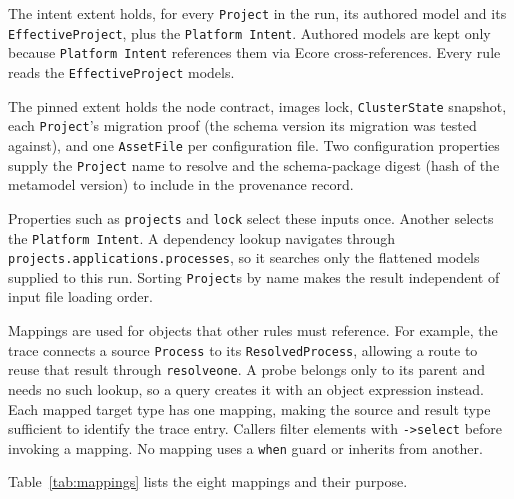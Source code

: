 The intent extent holds, for every \texttt{Project} in the run, its authored model and
its \texttt{EffectiveProject}, plus the \texttt{Platform Intent}. Authored models are kept only
because \texttt{Platform Intent} references them via Ecore cross-references. Every rule
reads the \texttt{EffectiveProject} models.

The pinned extent holds the node contract, images lock, \texttt{ClusterState}
snapshot, each \texttt{Project}'s migration proof (the schema version its
migration was tested against), and one \texttt{AssetFile} per configuration file. Two configuration
properties supply the \texttt{Project} name to resolve and the schema-package digest (hash of the metamodel version) to include in the provenance record.

Properties such as \texttt{projects} and \texttt{lock} select these inputs
once. Another selects the \texttt{Platform Intent}. A dependency lookup navigates through
\texttt{projects.applications.processes}, so it searches only the
flattened models supplied to this run. Sorting \texttt{Project}s by name
makes the result independent of input file loading order.

Mappings are used for objects that other rules must reference. For example,
the trace connects a source \texttt{Process} to its
\texttt{ResolvedProcess}, allowing a route to reuse that result through
\texttt{resolveone}. A probe belongs only to its parent and needs no such
lookup, so a query creates it with an object expression instead. Each
mapped target type has one mapping, making the source and result type
sufficient to identify the trace entry. Callers filter elements with
\texttt{->select} before invoking a mapping. No mapping uses a
\texttt{when} guard or inherits from another.

Table~\ref{tab:mappings} lists the eight mappings and their purpose.

